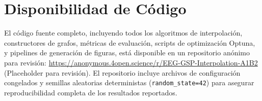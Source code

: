 \section{Disponibilidad de Código}

El código fuente completo, incluyendo todos los algoritmos de interpolación, constructores de grafos, métricas de evaluación, scripts de optimización Optuna, y pipelines de generación de figuras, está disponible en un repositorio anónimo para revisión: \url{https://anonymous.4open.science/r/EEG-GSP-Interpolation-A1B2} (Placeholder para revisión). El repositorio incluye archivos de configuración congelados y semillas aleatorias deterministas (\texttt{random\_state=42}) para asegurar reproducibilidad completa de los resultados reportados.
